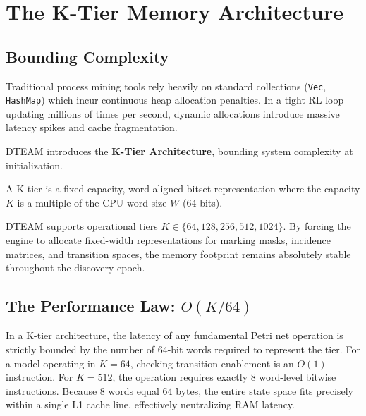 \chapter{The K-Tier Memory Architecture}
\section{Bounding Complexity}
Traditional process mining tools rely heavily on standard collections (\texttt{Vec}, \texttt{HashMap}) which incur continuous heap allocation penalties. In a tight RL loop updating millions of times per second, dynamic allocations introduce massive latency spikes and cache fragmentation.

DTEAM introduces the \textbf{K-Tier Architecture}, bounding system complexity at initialization.

\begin{definition}[K-Tier]
A K-tier is a fixed-capacity, word-aligned bitset representation where the capacity $K$ is a multiple of the CPU word size $W$ (64 bits).
\end{definition}

DTEAM supports operational tiers $K \in \{64, 128, 256, 512, 1024\}$. By forcing the engine to allocate fixed-width representations for marking masks, incidence matrices, and transition spaces, the memory footprint remains absolutely stable throughout the discovery epoch.

\section{The Performance Law: $O(K/64)$}
In a K-tier architecture, the latency of any fundamental Petri net operation is strictly bounded by the number of 64-bit words required to represent the tier.
For a model operating in $K=64$, checking transition enablement is an $O(1)$ instruction. For $K=512$, the operation requires exactly 8 word-level bitwise instructions. Because 8 words equal 64 bytes, the entire state space fits precisely within a single L1 cache line, effectively neutralizing RAM latency.
